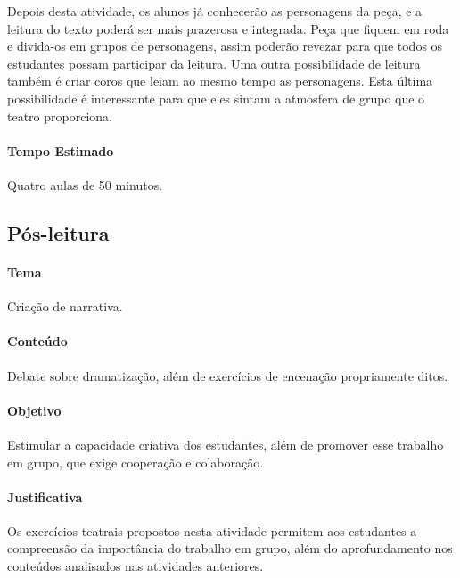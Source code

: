 \documentclass[11pt]{extarticle}
\begin{document}

Depois desta atividade, os alunos já conhecerão as personagens da peça, e a leitura do texto poderá ser mais prazerosa e integrada. Peça que fiquem em roda e divida-os em grupos de personagens, assim poderão revezar para que todos os estudantes possam participar da leitura. Uma outra possibilidade de leitura também é criar coros que leiam ao mesmo tempo as personagens. Esta última possibilidade é interessante para que eles sintam a atmosfera de grupo que o teatro proporciona.

\paragraph{Tempo Estimado} Quatro aulas de 50 minutos. 

\subsection{Pós-leitura} 


\paragraph{Tema} Criação de narrativa. 

\paragraph{Conteúdo} Debate sobre dramatização, além de exercícios de encenação propriamente ditos. 

\paragraph{Objetivo} Estimular a capacidade criativa dos estudantes, além de promover esse trabalho em grupo, que exige cooperação e colaboração. 

\paragraph{Justificativa} Os exercícios teatrais propostos nesta atividade permitem aos estudantes a compreensão da importância do trabalho em grupo, além do aprofundamento nos conteúdos analisados nas atividades anteriores.   
\end{document}
